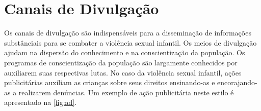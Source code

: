 





\section{Canais de Divulgação}\label{sec:propagandas}

Os canais de divulgação são indispensáveis para a disseminação de informações substânciais para se combater a violência sexual infantil. Os meios de divulgação ajudam na dispersão do conhecimento e na conscientização da população. Os programas de conscientização da população são largamente conhecidos por auxiliarem suas respectivas lutas. %
No caso da violência sexual infantil, ações publicitárias auxiliam as crianças sobre seus direitos ensinando-as e encorajando-as a realizarem denúncias. Um exemplo de ação publicitária neste estilo é apresentado na \autoref{fig:ad}.

